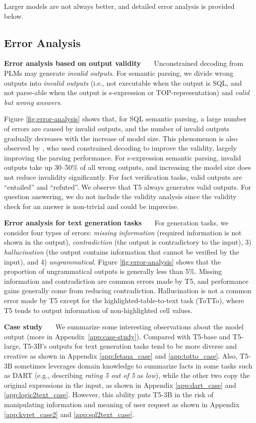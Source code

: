 Larger models are not always better, and detailed error analysis is provided below. 

\subsection{Error Analysis}
\label{subsec:error}

\textbf{Error analysis based on output validity \ \ } Unconstrained decoding from PLMs may generate \textit{invalid outputs}. For semantic parsing, we divide wrong outputs into \textit{invalid outputs} (i.e., not executable when the output is SQL, and not parse-able when the output is s-expression or TOP-representation) and \textit{valid but wrong answers}. 

Figure \ref{fig:error-analysis} shows that, for SQL semantic parsing, a large number of errors are caused by invalid outputs, and the number of invalid outputs gradually decreases with the increase of model size. This phenomenon is also observed by \citet{Scholak2021:PICARD}, who used constrained decoding to improve the validity, largely improving the parsing performance. For s-expression semantic parsing, invalid outputs take up 30--50\% of all wrong outputs, and increasing the model size does not reduce invalidity significantly. For fact verification tasks, valid outputs are ``entailed'' and ``refuted''. We observe that T5 always generates valid outputs. For question answering, we do not include the validity analysis since the validity check for an answer is non-trivial and could be imprecise. 

\textbf{Error analysis for text generation tasks \ \ } For generation tasks, we consider four types of errors: \textit{missing information} (required information is not shown in the output), \textit{contradiction} (the output is contradictory to the input), 3) \textit{hallucination} (the output contains information that cannot be verified by the input), and 4) \textit{ungrammatical}. 
Figure \ref{fig:error-analysis} shows that the proportion of ungrammatical outputs is generally less than 5\%. 
Missing information and contradiction are common errors made by T5, and performance gains generally come from reducing contradiction. Hallucination is not a common error made by T5 except for the highlighted-table-to-text task (ToTTo), where T5 tends to output information of non-highlighted cell values.

\textbf{Case study \ \ } We summarize some interesting observations about the model output (more in Appendix~\ref{app:case-study}).
Compared with T5-base and T5-large, T5-3B's outputs for text generation tasks tend to be more diverse and creative as shown in Appendix \ref{app:fetaqa_case} and \ref{app:totto_case}.
Also, T5-3B sometimes leverages domain knowledge to summarize facts in some tasks such as DART (e.g., describing \textit{rating 5 out of 5} as \textit{low}), while the other two copy the original expressions in the input, as shown in Appendix \ref{app:dart_case} and \ref{app:logic2text_case}.
However, this ability puts T5-3B in the risk of manipulating information and meaning of user request as shown in Appendix \ref{app:kvret_case2} and \ref{app:sql2text_case}. 

